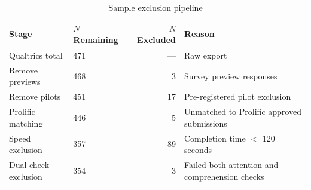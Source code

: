 \begin{table}[htbp]
\centering
\small
\caption{Sample exclusion pipeline}
\label{tab:exclusion}
\begin{tabular}{llrl}
\toprule
Stage & $N$ Remaining & $N$ Excluded & Reason \\
\midrule
Qualtrics total        & 471 & ---  & Raw export \\
Remove previews        & 468 & 3   & Survey preview responses \\
Remove pilots          & 451 & 17  & Pre-registered pilot exclusion \\
Prolific matching      & 446 & 5   & Unmatched to Prolific approved submissions \\
Speed exclusion        & 357 & 89  & Completion time $<$ 120 seconds \\
Dual-check exclusion   & 354 & 3   & Failed both attention and comprehension checks \\
\bottomrule
\end{tabular}
\end{table}
